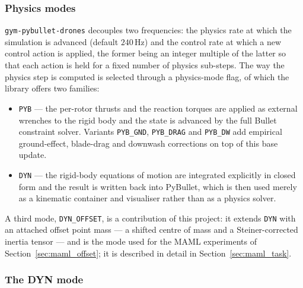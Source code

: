 \documentclass[11pt,a4paper]{article}
\theoremstyle{remark}
\numberwithin{equation}{section}
\begin{document}
\subsubsection*{Physics modes}

\texttt{gym-pybullet-drones} decouples two frequencies: the physics rate at which
the simulation is advanced (default $240\,\mathrm{Hz}$) and the control rate at
which a new control action is applied, the former being an integer multiple of
the latter so that each action is held for a fixed number of physics sub-steps.
The way the physics step is computed is selected through a physics-mode flag, of
which the library offers two families:
\begin{itemize}
    \item \texttt{PYB} --- the per-rotor thrusts and the reaction torques are
    applied as external wrenches to the rigid body and the state is advanced by
    the full Bullet constraint solver. Variants
    \texttt{PYB\_GND}, \texttt{PYB\_DRAG} and \texttt{PYB\_DW} add empirical
    ground-effect, blade-drag and downwash corrections on top of this base
    update.
    \item \texttt{DYN} --- the rigid-body equations of motion are integrated
    explicitly in closed form and the result is written back into PyBullet,
    which is then used merely as a kinematic container and visualiser rather
    than as a physics solver.
\end{itemize}
A third mode, \texttt{DYN\_OFFSET}, is a contribution of this project: it
extends \texttt{DYN} with an attached offset point mass --- a shifted centre of
mass and a Steiner-corrected inertia tensor --- and is the mode used for the
MAML experiments of Section~\ref{sec:maml_offset}; it is described in detail in
Section~\ref{sec:maml_task}.

\subsubsection*{The DYN mode}
\end{document}
